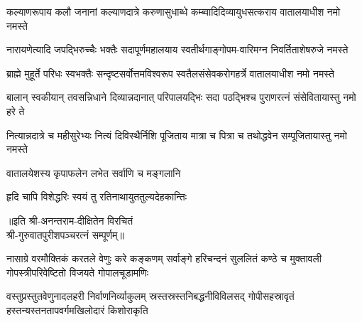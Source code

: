 
\fourlineindentedshloka
{कल्याणरूपाय कलौ जनानां}
{कल्याणदात्रे करुणासुधाब्धे}
{कम्ब्वादिदिव्यायुधसत्कराय}
{वातालयाधीश नमो नमस्ते}

\fourlineindentedshloka
{नारायणेत्यादि जपद्भिरुच्चैः}
{भक्तैः सदापूर्णमहालयाय}
{स्वतीर्थगाङ्गोपम-वारिमग्न}
{निवर्तिताशेषरुजे नमस्ते}

\fourlineindentedshloka
{ब्राह्मे मुहूर्ते परिधः स्वभक्तैः}
{सन्दृष्टसर्वोत्तमविश्वरूप}
{स्वतैलसंसेवकरोगहर्त्रे}
{वातालयाधीश नमो नमस्ते}

\fourlineindentedshloka
{बालान् स्वकीयान् तवसन्निधाने}
{दिव्यान्नदानात् परिपालयद्भिः}
{सदा पठद्भिश्च पुराणरत्नं}
{संसेवितायास्तु नमो हरे ते}

\fourlineindentedshloka
{नित्यान्नदात्रे च महीसुरेभ्यः}
{नित्यं दिविस्थैर्निशि पूजिताय}
{मात्रा च पित्रा च तथोद्धवेन}
{सम्पूजितायास्तु नमो नमस्ते}

{वातालयेशस्य कृपाफलेन लभेत सर्वाणि च मङ्गलानि}

{हृदि चापि विशेद्धरिः स्वयं तु रतिनाथायुततुल्यदेहकान्तिः}

॥इति श्री-अनन्तराम-दीक्षितेन विरचितं\\ श्री-गुरुवातपुरीशपञ्चरत्नं सम्पूर्णम्‌॥

\closesub

\setlength{\shlokaspaceskip}{6pt}
{नासाग्रे वरमौक्तिकं करतले वेणुः करे कङ्कणम्}
{सर्वाङ्गे हरिचन्दनं सुललितं कण्ठे च मुक्तावली}
{गोपस्त्रीपरिवेष्टितो विजयते गोपालचूडामणिः}

{वस्तुप्रस्तुतवेणुनादलहरी निर्वाणनिर्व्याकुलम्}
{स्रस्तस्रस्तनिबद्धनीविविलसद् गोपीसहस्रावृतं}
{हस्तन्यस्तनतापवर्गमखिलोदारं किशोराकृति}


\setlength{\shlokaspaceskip}{24pt}